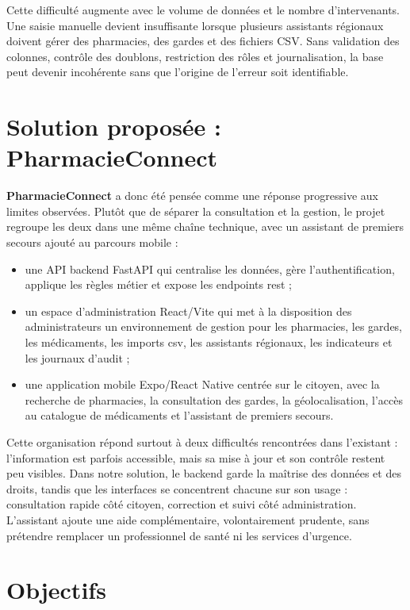 Cette difficulté augmente avec le volume de données et le nombre d'intervenants. Une saisie manuelle devient
insuffisante lorsque plusieurs assistants régionaux doivent gérer des pharmacies, des gardes et des fichiers
CSV. Sans validation des colonnes, contrôle des doublons, restriction des rôles et journalisation, la base
peut devenir incohérente sans que l'origine de l'erreur soit identifiable.

\section{Solution proposée : PharmacieConnect}

\textbf{PharmacieConnect} a donc été pensée comme une réponse progressive aux limites observées. Plutôt que
de séparer la consultation et la gestion, le projet regroupe les deux dans une même chaîne technique, avec un
assistant de premiers secours ajouté au parcours mobile :

\begin{itemize}
    \item une API backend FastAPI qui centralise les données, gère l'authentification, applique les règles
    métier et expose les endpoints \gls{rest} ;
    \item un espace d'administration React/Vite qui met à la disposition des administrateurs un environnement
    de gestion pour les pharmacies, les gardes, les médicaments, les imports \gls{csv}, les assistants
    régionaux, les indicateurs et les journaux d'audit ;
    \item une application mobile Expo/React Native centrée sur le citoyen, avec la recherche de
    pharmacies, la consultation des gardes, la géolocalisation, l'accès au catalogue de médicaments et
    l'assistant de premiers secours.
\end{itemize}

Cette organisation répond surtout à deux difficultés rencontrées dans l'existant : l'information est parfois
accessible, mais sa mise à jour et son contrôle restent peu visibles. Dans notre solution, le backend garde
la maîtrise des données et des droits, tandis que les interfaces se concentrent chacune sur son usage :
consultation rapide côté citoyen, correction et suivi côté administration. L'assistant ajoute une aide
complémentaire, volontairement prudente, sans prétendre remplacer un professionnel de santé ni les services
d'urgence.

\section{Objectifs}

